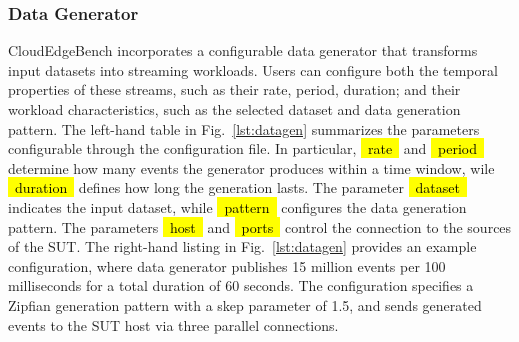 \documentclass[runningheads]{llncs}
\newcommand*{\codebox}[1]{{\ttfamily\hyphenchar\font=45\relax\hl{~#1~}}}
\begin{document}
\subsubsection{Data Generator}
CloudEdgeBench incorporates a configurable data generator that transforms input datasets into streaming workloads. %
Users can configure both the temporal properties of these streams, such as their rate, period, duration; and their workload characteristics, such as the selected dataset and data generation pattern.
The left-hand table in Fig.~\ref{lst:datagen} summarizes the parameters configurable through the configuration file.
In particular, \codebox{rate} and \codebox{period} determine how many events the generator produces within a time window, wile \codebox{duration} defines how long the generation lasts.
The parameter \codebox{dataset} indicates the input dataset, while \codebox{pattern} configures the data generation pattern.
The parameters \codebox{host} and \codebox{ports} control the connection to the sources of the SUT.
The right-hand listing in Fig.~\ref{lst:datagen} provides an example configuration, where data generator publishes 15 million events per 100 milliseconds for a total duration of 60 seconds.
The configuration specifies a Zipfian generation pattern with a skep parameter of 1.5, and sends generated events to the SUT host via three parallel connections.
\end{document}
